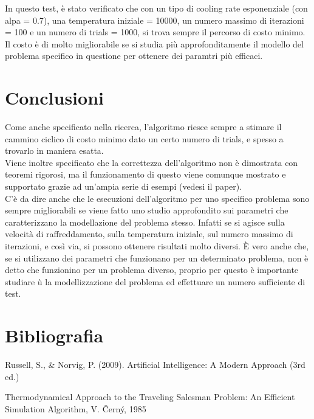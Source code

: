 \documentclass[11pt]{article}
\begin{document}
        In questo test, è stato verificato che con un tipo di cooling rate esponenziale (con alpa = 0.7), una temperatura iniziale = 10000,
        un numero massimo di iterazioni = 100 e un numero di trials = 1000, si trova sempre il percorso di costo minimo.
        Il costo è di molto migliorabile se si studia più approfonditamente il modello del problema specifico in questione per ottenere dei paramtri più efficaci.

    \section{Conclusioni} \label{sec:conclusiona}

        Come anche specificato nella ricerca, l'algoritmo riesce sempre a stimare il cammino ciclico di costo minimo dato un certo numero di trials,
        e spesso a trovarlo in maniera esatta. \\
        Viene inoltre specificato che la correttezza dell'algoritmo non è dimostrata con teoremi rigorosi, ma il funzionamento di
        questo viene comunque mostrato e supportato grazie ad un'ampia serie di esempi (vedesi il paper). \\
        C'è da dire anche che le esecuzioni dell'algoritmo per uno specifico problema sono sempre migliorabili se viene fatto uno studio approfondito
        sui parametri che caratterizzano la modellazione del problema stesso. Infatti se si agisce sulla velocità di raffreddamento, sulla temperatura iniziale,
        sul numero massimo di iterazioni, e così via, si possono ottenere risultati molto diversi. È vero anche che, se si utilizzano dei parametri che
        funzionano per un determinato problema, non è detto che funzionino per un problema diverso, proprio per questo è importante studiare ù
        la modellizzazione del problema ed effettuare un numero sufficiente di test.

    \section{Bibliografia} \label{sec:bibliography}

        Russell, S., & Norvig, P. (2009). Artificial Intelligence: A Modern Approach (3rd ed.)

        Thermodynamical Approach to the Traveling Salesman Problem: An Efficient Simulation Algorithm, V. Černý, 1985
\end{document}
